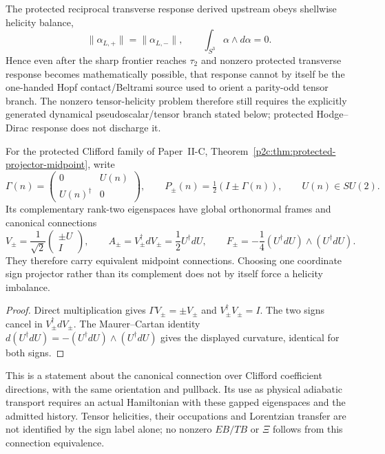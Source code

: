 \documentclass[12pt,a4paper]{article}
\begin{document}
\begin{remark}
\label{p8:rem:v261-protected-response-helicity-firewall}
The protected reciprocal transverse response derived upstream obeys shellwise
helicity balance,
\[
 \|\alpha_{L,+}\|=\|\alpha_{L,-}\|,
 \qquad
 \boxed{\int_{S^3}\alpha\wedge d\alpha=0.}
\]
Hence even after the sharp frontier reaches \(\tau_2\) and nonzero protected
transverse response becomes mathematically possible, that response cannot by
itself be the one-handed Hopf contact/Beltrami source used to orient a
parity-odd tensor branch.  The nonzero tensor-helicity problem therefore still
requires the explicitly generated dynamical pseudoscalar/tensor branch stated
below; protected Hodge--Dirac response does not discharge it.
\end{remark}


\begin{proposition}
\label{p8:prop:v2213-projector-sign-midpoint}
For the protected Clifford family of Paper~II-C,
Theorem~\ref{p2c:thm:protected-projector-midpoint}, write
\[
 \Gamma(n)=\begin{pmatrix}0&U(n)\\U(n)^\dagger&0\end{pmatrix},
 \qquad P_\pm(n)=\tfrac12(I\pm\Gamma(n)),\qquad U(n)\in SU(2).
\]
Its complementary rank-two eigenspaces have global orthonormal frames
and canonical connections
\begin{equation}
\label{p8:eq:v2213-projector-sign-midpoint}
 V_\pm=\frac1{\sqrt2}\begin{pmatrix}\pm U\\I\end{pmatrix},
 \qquad A_\pm=V_\pm^\dagger dV_\pm=\frac12U^\dagger dU,
 \qquad F_\pm=-\frac14(U^\dagger dU)\wedge(U^\dagger dU).
\end{equation}
They therefore carry equivalent midpoint connections. Choosing one coordinate
sign projector rather than its complement does not by itself force a
helicity imbalance.
\end{proposition}
\begin{proof}
Direct multiplication gives $\Gamma V_\pm=\pm V_\pm$ and
$V_\pm^\dagger V_\pm=I$. The two signs cancel in
$V_\pm^\dagger dV_\pm$. The Maurer--Cartan identity
$d(U^\dagger dU)=-(U^\dagger dU)\wedge(U^\dagger dU)$ gives the displayed
curvature, identical for both signs.
\end{proof}
This is a statement about the canonical connection over Clifford coefficient
directions, with the same orientation and pullback. Its use as physical
adiabatic transport requires an actual Hamiltonian with these gapped
eigenspaces and the admitted history. Tensor helicities, their occupations
and Lorentzian transfer are not identified by the sign label alone; no
nonzero $EB/TB$ or $\Xi$ follows from this connection equivalence.
\end{document}

